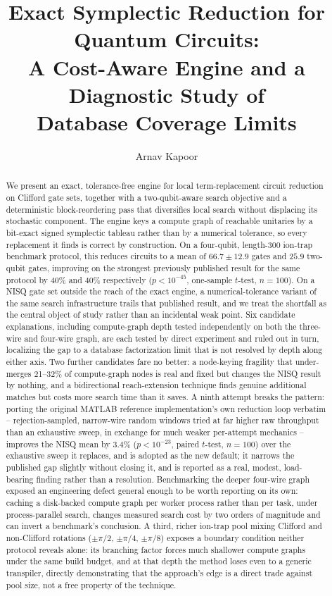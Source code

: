 \documentclass[11pt]{article}
\title{\vspace{-1em}Exact Symplectic Reduction for Quantum Circuits:\\
A Cost-Aware Engine and a Diagnostic Study of\\
Database Coverage Limits}
\author[1]{Arnav Kapoor}
\affil[1]{Indian Institute of Science Education and Research Bhopal}
\date{}
\begin{document}
\maketitle
\vspace{-2.5em}

\begin{abstract}
\noindent
We present an exact, tolerance-free engine for local term-replacement
circuit reduction on Clifford gate sets, together with a two-qubit-aware
search objective and a deterministic block-reordering pass that
diversifies local search without displacing its stochastic component. The
engine keys a compute graph of reachable unitaries by a bit-exact signed
symplectic tableau rather than by a numerical tolerance, so every
replacement it finds is correct by construction. On a four-qubit,
length-300 ion-trap benchmark protocol, this reduces circuits to a mean of
$66.7\pm12.9$ gates and $25.9$ two-qubit gates, improving on the strongest
previously published result for the same protocol by 40\% and 40\%
respectively ($p<10^{-45}$, one-sample $t$-test, $n=100$). On a NISQ gate
set outside the reach of the exact engine, a numerical-tolerance variant of
the same search infrastructure trails that published result, and we treat
the shortfall as the central object of study rather than an incidental
weak point. Six candidate explanations, including compute-graph depth
tested independently on both the three-wire and four-wire graph, are each
tested by direct experiment and ruled out in turn, localizing the gap to
a database factorization limit that is not resolved by depth along either
axis. Two further candidates fare no better: a node-keying fragility that
under-merges 21--32\% of compute-graph nodes is real and fixed but changes
the NISQ result by nothing, and a bidirectional reach-extension technique
finds genuine additional matches but costs more search time than it saves.
A ninth attempt breaks the pattern: porting the original MATLAB reference
implementation's own reduction loop verbatim -- rejection-sampled,
narrow-wire random windows tried at far higher raw throughput than an
exhaustive sweep, in exchange for much weaker per-attempt mechanics --
improves the NISQ mean by $3.4\%$ ($p<10^{-23}$, paired $t$-test, $n=100$)
over the exhaustive sweep it replaces, and is adopted as the new default;
it narrows the published gap slightly without closing it, and is reported
as a real, modest, load-bearing finding rather than a resolution.
Benchmarking the deeper four-wire graph exposed an engineering
defect general enough to be worth reporting on its own: caching a
disk-backed compute graph per worker process rather than per task, under
process-parallel search, changes measured search cost by two orders of
magnitude and can invert a benchmark's conclusion. A third, richer
ion-trap pool mixing Clifford and non-Clifford rotations ($\pm\pi/2$,
$\pm\pi/4$, $\pm\pi/8$) exposes a boundary condition neither protocol
reveals alone: its branching factor forces much shallower compute graphs
under the same build budget, and at that depth the method loses even to a
generic transpiler, directly demonstrating that the approach's edge is
a direct trade against pool size, not a free property of the technique.
\end{abstract}
\end{document}
